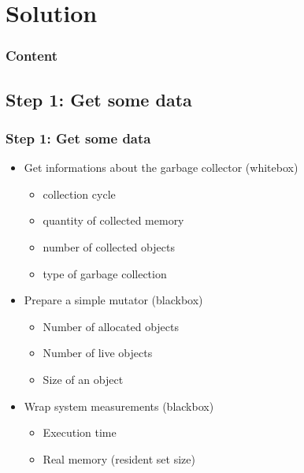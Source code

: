 \documentclass[xcolor=x11names,compress]{beamer}
\begin{document}
	\section{Solution}

	\begin{frame}
		\frametitle{Content}
		\setcounter{tocdepth}{2}
		\tableofcontents[currentsection]
	\end{frame}

	\subsection{Step 1: Get some data}
	\begin{frame}
		\frametitle{Step 1: Get some data}
		\begin{itemize}
			\item Get informations about the garbage collector (whitebox)
			\begin{itemize}
				\item collection cycle
				\item quantity of collected memory
				\item number of collected objects
				\item type of garbage collection
			\end{itemize}
			
			\pause
			
			\item Prepare a simple mutator (blackbox)
			\begin{itemize}
				\item Number of allocated objects
				\item Number of live objects
				\item Size of an object
			\end{itemize}
			
			\pause
			
			\item Wrap system measurements (blackbox)
			\begin{itemize}
				\item Execution time
				\item Real memory (resident set size) 
			\end{itemize}
		\end{itemize}
	\end{frame}
	
\end{document}
